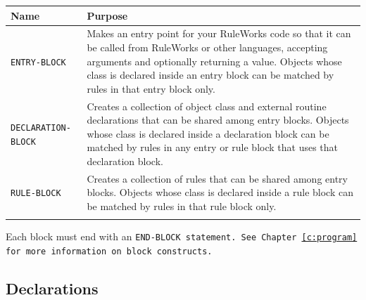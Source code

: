 \begin{tabularx}{\columnwidth}{lX}
    \toprule
    Name & Purpose \\
    \midrule
    \tt{ENTRY-BLOCK} & Makes an entry point
                       for your RuleWorks   
                       code so that it can  
                       be called from       
                       RuleWorks or other   
                       languages, accepting 
                       arguments and        
                       optionally returning 
                       a value. Objects     
                       whose class is       
                       declared inside an   
                       entry block can be   
                       matched by rules in  
                       that entry block     
                       only. \\\addlinespace
    \tt{DECLARATION-BLOCK} & Creates a collection
                             of object class and  
                             external routine     
                             declarations that    
                             can be shared among  
                             entry blocks.        
                             Objects whose class  
                             is declared inside a 
                             declaration block    
                             can be matched by    
                             rules in any entry   
                             or rule block that   
                             uses that            
                             declaration block. \\\addlinespace
    \tt{RULE-BLOCK} & Creates a collection
                      of rules that can be 
                      shared among entry   
                      blocks. Objects      
                      whose class is       
                      declared inside a    
                      rule block can be    
                      matched by rules in  
                      that rule block      
                      only. \\\addlinespace
    \bottomrule
  \end{tabularx}


Each block must end with an \tt{END-BLOCK} statement. See
Chapter~\ref{c:program} for more information on block constructs.

\subsection{Declarations}

